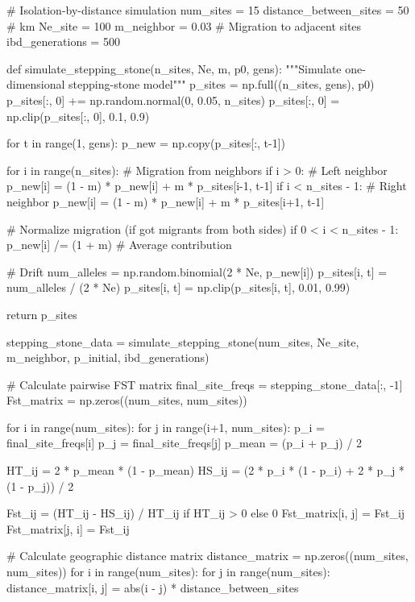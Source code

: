 \documentclass[11pt,a4paper]{article}
\begin{document}
\begin{pycode}
# Isolation-by-distance simulation
num_sites = 15
distance_between_sites = 50  # km
Ne_site = 100
m_neighbor = 0.03  # Migration to adjacent sites
ibd_generations = 500

def simulate_stepping_stone(n_sites, Ne, m, p0, gens):
    """Simulate one-dimensional stepping-stone model"""
    p_sites = np.full((n_sites, gens), p0)
    p_sites[:, 0] += np.random.normal(0, 0.05, n_sites)
    p_sites[:, 0] = np.clip(p_sites[:, 0], 0.1, 0.9)

    for t in range(1, gens):
        p_new = np.copy(p_sites[:, t-1])

        for i in range(n_sites):
            # Migration from neighbors
            if i > 0:  # Left neighbor
                p_new[i] = (1 - m) * p_new[i] + m * p_sites[i-1, t-1]
            if i < n_sites - 1:  # Right neighbor
                p_new[i] = (1 - m) * p_new[i] + m * p_sites[i+1, t-1]

            # Normalize migration (if got migrants from both sides)
            if 0 < i < n_sites - 1:
                p_new[i] /= (1 + m)  # Average contribution

            # Drift
            num_alleles = np.random.binomial(2 * Ne, p_new[i])
            p_sites[i, t] = num_alleles / (2 * Ne)
            p_sites[i, t] = np.clip(p_sites[i, t], 0.01, 0.99)

    return p_sites

stepping_stone_data = simulate_stepping_stone(num_sites, Ne_site, m_neighbor, p_initial, ibd_generations)

# Calculate pairwise FST matrix
final_site_freqs = stepping_stone_data[:, -1]
Fst_matrix = np.zeros((num_sites, num_sites))

for i in range(num_sites):
    for j in range(i+1, num_sites):
        p_i = final_site_freqs[i]
        p_j = final_site_freqs[j]
        p_mean = (p_i + p_j) / 2

        HT_ij = 2 * p_mean * (1 - p_mean)
        HS_ij = (2 * p_i * (1 - p_i) + 2 * p_j * (1 - p_j)) / 2

        Fst_ij = (HT_ij - HS_ij) / HT_ij if HT_ij > 0 else 0
        Fst_matrix[i, j] = Fst_ij
        Fst_matrix[j, i] = Fst_ij

# Calculate geographic distance matrix
distance_matrix = np.zeros((num_sites, num_sites))
for i in range(num_sites):
    for j in range(num_sites):
        distance_matrix[i, j] = abs(i - j) * distance_between_sites


\end{pycode}
\end{document}
